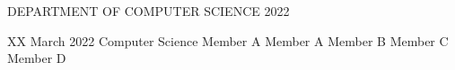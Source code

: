 \documentclass[thesis]{uathesis}
\begin{document}
\maketitlepage
{DEPARTMENT OF COMPUTER SCIENCE}	%
{2022}							

\approval
{XX March 2022}		  %
{Computer Science}	%
{Member A}		%
{Member A}    %
{Member B}		%
{Member C}		  %
{Member D}		    %
\BgThispage



\tableofcontents

\listoffigures

\listoftables







\appendix


\renewcommand{\baselinestretch}{1}		%
\small\normalsize										%



\end{document}
